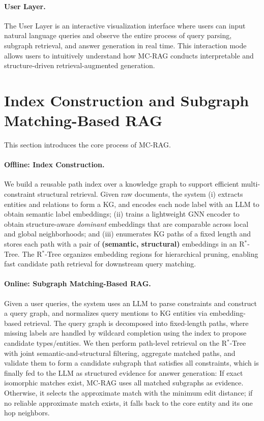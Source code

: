 \documentclass{article}
\begin{document}
\paragraph{User Layer.}

The User Layer is an interactive visualization interface where users can input natural language queries and observe the entire process of query parsing, subgraph retrieval, and answer generation in real time. 
This interaction mode allows users to intuitively understand how \textsc{MC-RAG} conducts interpretable and structure-driven retrieval-augmented generation.

\section{Index Construction and Subgraph Matching-Based RAG}

This section introduces the core process of \textsc{MC-RAG}.


\paragraph{Offline: Index Construction.}
We build a reusable path index over a knowledge graph to support efficient multi-constraint structural retrieval. Given raw documents, the system (i) extracts entities and relations to form a KG, and encodes each node label with an LLM to obtain semantic label embeddings; (ii) trains a lightweight GNN encoder to obtain structure-aware \emph{dominant} embeddings that are comparable across local and global neighborhoods; and (iii) enumerates KG paths of a fixed length and stores each path with a pair of \textbf{(semantic, structural)} embeddings in an R$^\ast$-Tree. The R$^\ast$-Tree organizes embedding regions for hierarchical pruning, enabling fast candidate path retrieval for downstream query matching.


\paragraph{Online: Subgraph Matching-Based RAG.}
Given a user queries, the system uses an LLM to parse constraints and construct a query graph, and normalizes query mentions to KG entities via embedding-based retrieval. The query graph is decomposed into fixed-length paths, where missing labels are handled by wildcard completion using the index to propose candidate types/entities. We then perform path-level retrieval on the R$^\ast$-Tree with joint semantic-and-structural filtering, aggregate matched paths, and validate them to form a candidate subgraph that satisfies all constraints, which is finally fed to the LLM as structured evidence for answer generation: If exact isomorphic matches exist, \textsc{MC-RAG} uses all matched subgraphs as
evidence. Otherwise, it selects the approximate match with the minimum
edit distance; if no reliable approximate match exists, it falls back to
the core entity and its one hop neighbors.
\end{document}
